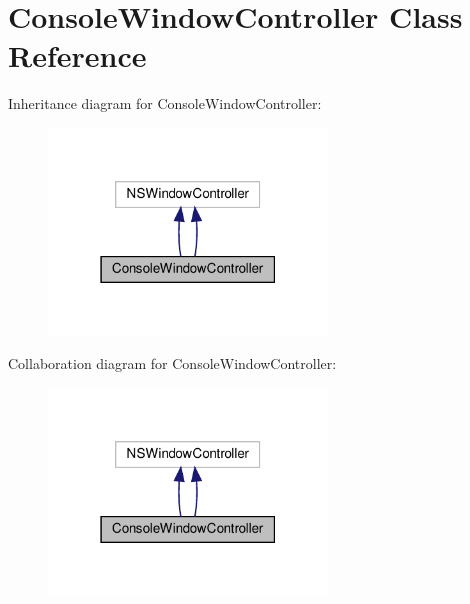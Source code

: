 \hypertarget{interfaceConsoleWindowController}{}\section{Console\+Window\+Controller Class Reference}
\label{interfaceConsoleWindowController}


Inheritance diagram for Console\+Window\+Controller\+:
\nopagebreak
\begin{figure}[H]
\begin{center}
\leavevmode
\includegraphics[width=210pt]{interfaceConsoleWindowController__inherit__graph}
\end{center}
\end{figure}


Collaboration diagram for Console\+Window\+Controller\+:
\nopagebreak
\begin{figure}[H]
\begin{center}
\leavevmode
\includegraphics[width=210pt]{interfaceConsoleWindowController__coll__graph}
\end{center}
\end{figure}
